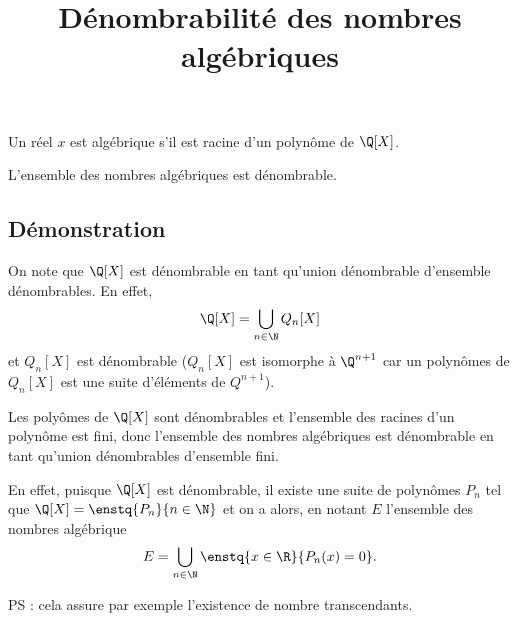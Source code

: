 \documentclass[fontsize=12pt,twoside=false,parskip=half, french]{scrartcl}
\title{Dénombrabilité des nombres algébriques}
\date{}
\author{}
\begin{document}
\maketitle
   Un réel $x$ est algébrique s'il est racine d'un polynôme de $\Q[X]$.
   \begin{Theoreme}
      L'ensemble des nombres algébriques est dénombrable.
   \end{Theoreme}
   \subsection{Démonstration}
      
      On note que $\Q[X]$ est dénombrable en tant qu'union dénombrable d'ensemble 
      dénombrables. En effet,
      \[
        \Q[X] = \bigcup_{n \in \N} Q_n[X]
      \]
      et $Q_n[X]$ est dénombrable ($Q_n[X]$ est isomorphe à $\Q^{n + 1}$ car
      un polynômes de $Q_n[X]$ est une suite d'éléments de $Q^{n + 1}$).
      
      Les polyômes de $\Q[X]$ sont dénombrables et l'ensemble des racines d'un
      polynôme est fini, donc l'ensemble des nombres algébriques est dénombrable
      en tant qu'union dénombrables d'ensemble fini.
      
      En effet, puisque $\Q[X]$ est dénombrable, il existe une suite de polynômes
      $P_n$ tel que $\Q[X] = \enstq{P_n}{n \in \N}$  et on a alors, en notant $E$
      l'ensemble des nombres algébrique
      \[
        E = \bigcup_{n \in \N} \enstq{x \in \R}{P_n(x) = 0}.
      \] 
      
      PS : cela assure par exemple l'existence de nombre transcendants.
\end{document}
